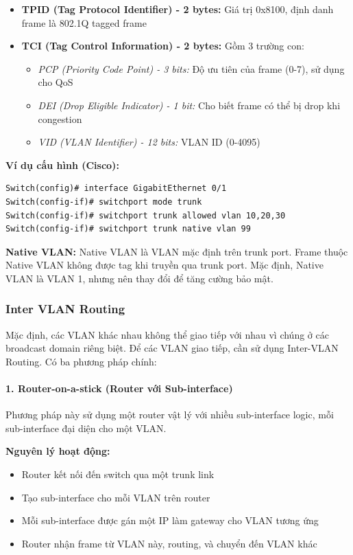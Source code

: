 \begin{itemize}
    \item \textbf{TPID (Tag Protocol Identifier) - 2 bytes:} Giá trị 0x8100, định danh frame là 802.1Q tagged frame
    \item \textbf{TCI (Tag Control Information) - 2 bytes:} Gồm 3 trường con:
    \begin{itemize}
        \item \textit{PCP (Priority Code Point) - 3 bits:} Độ ưu tiên của frame (0-7), sử dụng cho QoS
        \item \textit{DEI (Drop Eligible Indicator) - 1 bit:} Cho biết frame có thể bị drop khi congestion
        \item \textit{VID (VLAN Identifier) - 12 bits:} VLAN ID (0-4095)
    \end{itemize}
\end{itemize}

\textbf{Ví dụ cấu hình (Cisco):}
\begin{verbatim}
Switch(config)# interface GigabitEthernet 0/1
Switch(config-if)# switchport mode trunk
Switch(config-if)# switchport trunk allowed vlan 10,20,30
Switch(config-if)# switchport trunk native vlan 99
\end{verbatim}

\textbf{Native VLAN:}
Native VLAN là VLAN mặc định trên trunk port. Frame thuộc Native VLAN không được tag khi truyền qua trunk port. Mặc định, Native VLAN là VLAN 1, nhưng nên thay đổi để tăng cường bảo mật.

\subsubsection{Inter VLAN Routing}
Mặc định, các VLAN khác nhau không thể giao tiếp với nhau vì chúng ở các broadcast domain riêng biệt. Để các VLAN giao tiếp, cần sử dụng Inter-VLAN Routing. Có ba phương pháp chính:

\paragraph{1. Router-on-a-stick (Router với Sub-interface)}
Phương pháp này sử dụng một router vật lý với nhiều sub-interface logic, mỗi sub-interface đại diện cho một VLAN.

\textbf{Nguyên lý hoạt động:}
\begin{itemize}
    \item Router kết nối đến switch qua một trunk link
    \item Tạo sub-interface cho mỗi VLAN trên router
    \item Mỗi sub-interface được gán một IP làm gateway cho VLAN tương ứng
    \item Router nhận frame từ VLAN này, routing, và chuyển đến VLAN khác
\end{itemize}

